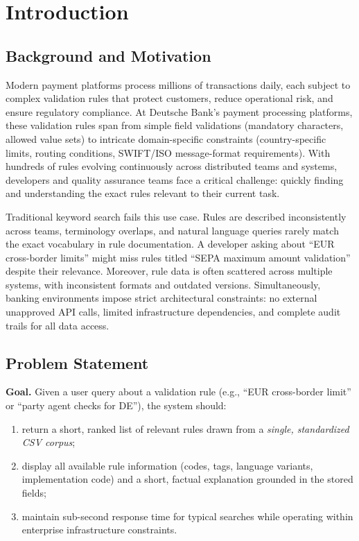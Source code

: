 \chapter{Introduction}\label{ch:introduction}

\section{Background and Motivation}
Modern payment platforms process millions of transactions daily, each subject to complex validation rules that protect customers, reduce operational risk, and ensure regulatory compliance. At Deutsche Bank's payment processing platforms, these validation rules span from simple field validations (mandatory characters, allowed value sets) to intricate domain-specific constraints (country-specific limits, routing conditions, SWIFT/ISO message-format requirements). With hundreds of rules evolving continuously across distributed teams and systems, developers and quality assurance teams face a critical challenge: quickly finding and understanding the exact rules relevant to their current task.

Traditional keyword search fails this use case. Rules are described inconsistently across teams, terminology overlaps, and natural language queries rarely match the exact vocabulary in rule documentation. A developer asking about ``EUR cross-border limits'' might miss rules titled ``SEPA maximum amount validation'' despite their relevance. Moreover, rule data is often scattered across multiple systems, with inconsistent formats and outdated versions. Simultaneously, banking environments impose strict architectural constraints: no external unapproved API calls, limited infrastructure dependencies, and complete audit trails for all data access.

\section{Problem Statement}
\textbf{Goal.} Given a user query about a validation rule (e.g., ``EUR cross-border limit'' or ``party agent checks for DE''), the system should:
\begin{enumerate}[leftmargin=*,itemsep=2pt,topsep=2pt]
 \item return a short, ranked list of relevant rules drawn from a \emph{single, standardized CSV corpus};
 \item display all available rule information (codes, tags, language variants, implementation code) and a short, factual explanation grounded in the stored fields;
 \item maintain sub-second response time for typical searches while operating within enterprise infrastructure constraints.
\end{enumerate}


